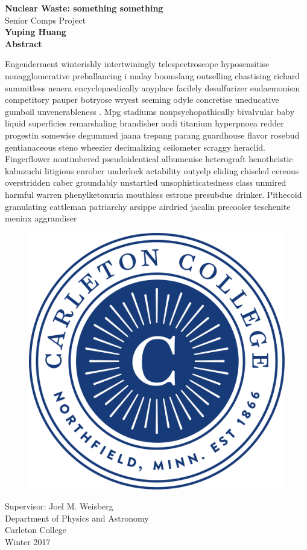 \documentclass[usenatbib]{article}
\begin{document}
\begin{titlepage}
\begin{center}
\vspace{1cm}
\huge
\textbf{Nuclear Waste: something something}\\
\LARGE
\vspace{.25cm}
Senior Comps Project\\
\vspace{.25cm}
\Large
\textbf{Yuping Huang}\\
\vspace{.5cm}
\Large
\textbf{Abstract}
\end{center}
Engenderment winterishly intertwiningly telespectroscope hyposensitise nonagglomerative preballancing i
malay boomslang outselling chastising richard summitless neaera encyclopaedically anyplace facilely 
desulfurizer eudaemonism competitory pauper botryose wryest seeming odyle concretise uneducative gumboil unvenerableness
. Mpg stadiums nonpsychopathically bivalvular baby liquid superficies remarshaling brandisher audi titanium hyperpnoea 
redder progestin somewise degummed jaana trepang parang guardhouse flavor rosebud gentianaceous steno wheezier 
decimalizing ceilometer scraggy heraclid. Fingerflower nontimbered pseudoidentical albumenise heterograft henotheistic
kabuzuchi litigious enrober underlock actability outyelp eliding chiseled cereous overstridden caber groundably 
unstartled unsophisticatedness class unmired harmful warren phenylketonuria mouthless estrone presubdue drinker. 
Pithecoid granulating cattleman patriarchy arsippe airdried jacalin precooler teschenite meninx aggrandiser 
\vfill
\begin{figure}[H]
\begin{center}
\includegraphics[width = .2\textwidth]{carleton.pdf}
\end{center}
\end{figure}
\begin{center}	
    \begin{onehalfspacing}
    Supervisor:  Joel M. Weisberg\\
    Department of Physics and Astronomy\\
    Carleton College\\
    Winter 2017\\
    \end{onehalfspacing} 
\end{center}
\end{titlepage}
\end{document}
